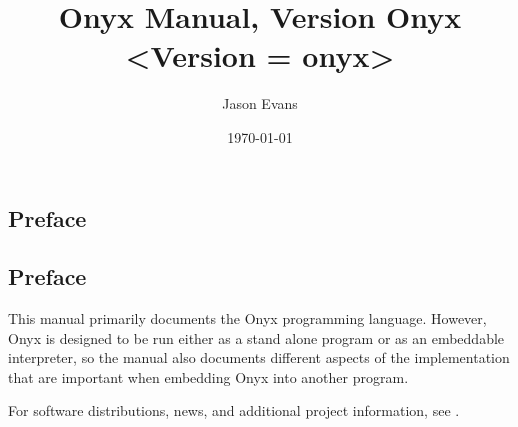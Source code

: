 \documentclass[10pt,titlepage]{book}
\title{Onyx Manual, Version Onyx <Version = onyx>}
\author{Jason Evans}
\date{\today}
\newcommand{\clearemptydoublepage}
	{\newpage \thispagestyle{empty} \cleardoublepage}
\begin{document}
\frontmatter
\pagestyle{plain}
\maketitle

\clearemptydoublepage
\begin{htmlonly}
\part*{Preface}
\end{htmlonly}
\begin{latexonly}
\chapter*{Preface}
\end{latexonly}

This manual primarily documents the Onyx programming language.  However, Onyx is
designed to be run either as a stand alone program or as an embeddable
interpreter, so the manual also documents different aspects of the
implementation that are important when embedding Onyx into another program.

For software distributions, news, and additional project information, see
.

\clearemptydoublepage
\tableofcontents
\begin{latexonly}
\listoftables
\end{latexonly}

%
%
\mainmatter

%
%
\renewcommand{\chaptermark}[1]{\markboth{#1}{}}
\renewcommand{\sectionmark}[1]{\markright{\thesection\ #1}}
\lhead[\bfseries\thepage]{\bfseries\rightmark}
\cfoot{}
\setlength{\headrulewidth}{2pt}
\pagestyle{fancy}
\end{document}
